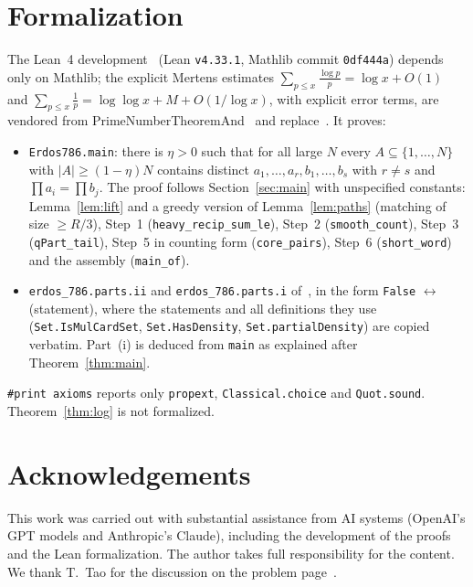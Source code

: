 \documentclass[11pt]{amsart}
\theoremstyle{definition}
\theoremstyle{remark}
\newcommand{\abs}[1]{\lvert #1\rvert}
\begin{document}
\section{Formalization}\label{sec:lean}
The Lean~4 development~\cite{repo} (Lean \texttt{v4.33.1}, Mathlib commit \texttt{0df444a}) depends only on Mathlib; the explicit Mertens estimates
$\sum_{p\le x}\frac{\log p}{p}=\log x+O(1)$ and $\sum_{p\le x}\frac1p=\log\log x+M+O(1/\log x)$, with explicit error terms, are vendored from PrimeNumberTheoremAnd~\cite{PNT} and replace~\cite{RS62}. It proves:
\begin{itemize}
\item \texttt{Erdos786.main}: there is $\eta>0$ such that for all large $N$ every $A\subseteq\{1,\dots,N\}$ with $\abs A\ge(1-\eta)N$ contains distinct $a_1,\dots,a_r,b_1,\dots,b_s$ with $r\ne s$ and $\prod a_i=\prod b_j$. The proof follows Section~\ref{sec:main} with unspecified constants: Lemma~\ref{lem:lift} and a greedy version of Lemma~\ref{lem:paths} (matching of size $\ge R/3$), Step~1 (\texttt{heavy\_recip\_sum\_le}), Step~2 (\texttt{smooth\_count}), Step~3 (\texttt{qPart\_tail}), Step~5 in counting form (\texttt{core\_pairs}), Step~6 (\texttt{short\_word}) and the assembly (\texttt{main\_of}).
\item \texttt{erdos\_786.parts.ii} and \texttt{erdos\_786.parts.i} of~\cite{FC}, in the form \texttt{False} $\leftrightarrow$ (statement), where the statements and all definitions they use (\texttt{Set.IsMulCardSet}, \texttt{Set.HasDensity}, \texttt{Set.partialDensity}) are copied verbatim. Part~(i) is deduced from \texttt{main} as explained after Theorem~\ref{thm:main}.
\end{itemize}
\texttt{\#print axioms} reports only \texttt{propext}, \texttt{Classical.choice} and \texttt{Quot.sound}. Theorem~\ref{thm:log} is not formalized.

\section*{Acknowledgements}
This work was carried out with substantial assistance from AI systems (OpenAI's GPT models and Anthropic's Claude), including the development of the proofs and the Lean formalization. The author takes full responsibility for the content. We thank T.~Tao for the discussion on the problem page~\cite{EP}.
\end{document}
